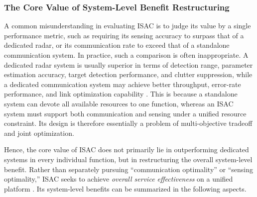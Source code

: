 \subsubsection{The Core Value of System-Level Benefit Restructuring}
\label{subsubsec:ch1-isac-core-value-benefit}

A common misunderstanding in evaluating ISAC is to judge its value by a single performance metric, such as requiring its sensing accuracy to surpass that of a dedicated radar, or its communication rate to exceed that of a standalone communication system. In practice, such a comparison is often inappropriate. A dedicated radar system is usually superior in terms of detection range, parameter estimation accuracy, target detection performance, and clutter suppression, while a dedicated communication system may achieve better throughput, error-rate performance, and link optimization capability \cite{Goldsmith2005,Liu2022ISAC,SkolnikRadarBook}. This is because a standalone system can devote all available resources to one function, whereas an ISAC system must support both communication and sensing under a unified resource constraint. Its design is therefore essentially a problem of multi-objective tradeoff and joint optimization.

Hence, the core value of ISAC does not primarily lie in outperforming dedicated systems in every individual function, but in restructuring the overall system-level benefit. Rather than separately pursuing ``communication optimality'' or ``sensing optimality,'' ISAC seeks to achieve \emph{overall service effectiveness} on a unified platform \cite{Liu2022ISAC,Gonzalez2024integrated}. Its system-level benefits can be summarized in the following aspects.

